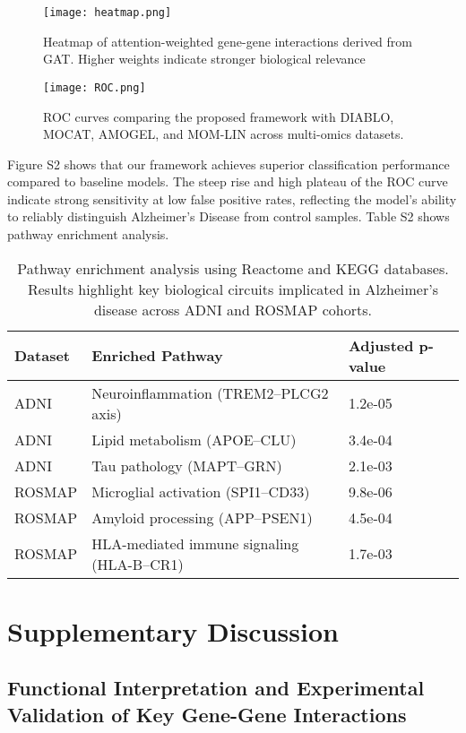 \documentclass[12pt]{article}
\begin{document}
\begin{figure}[H]
\centering
\texttt{[image: heatmap.png]}
\caption{Heatmap of attention-weighted gene-gene interactions derived from GAT. Higher weights indicate stronger biological relevance}
\end{figure}

\begin{figure}[H]
\centering
\texttt{[image: ROC.png]}
\caption{ROC curves comparing the proposed framework with DIABLO, MOCAT, AMOGEL, and MOM-LIN across multi-omics datasets.}
\end{figure}
Figure S2 shows that our framework achieves superior classification performance compared to baseline models. The steep rise and high plateau of the ROC curve indicate strong sensitivity at low false positive rates, reflecting the model’s ability to reliably distinguish Alzheimer’s Disease from control samples.
Table S2 shows pathway enrichment analysis.
\begin{table}[H]
\centering
\scriptsize
\begin{tabular}{lll}
\toprule
\textbf{Dataset} & \textbf{Enriched Pathway} & \textbf{Adjusted p-value} \\
\midrule
ADNI & Neuroinflammation (TREM2–PLCG2 axis) & 1.2e-05 \\
ADNI & Lipid metabolism (APOE–CLU) & 3.4e-04 \\
ADNI & Tau pathology (MAPT–GRN) & 2.1e-03 \\
ROSMAP & Microglial activation (SPI1–CD33) & 9.8e-06 \\
ROSMAP & Amyloid processing (APP–PSEN1) & 4.5e-04 \\
ROSMAP & HLA-mediated immune signaling (HLA-B–CR1) & 1.7e-03 \\
\bottomrule
\end{tabular}
\caption{Pathway enrichment analysis using Reactome and KEGG databases. Results highlight key biological circuits implicated in Alzheimer's disease across ADNI and ROSMAP cohorts.}
\end{table}
\section*{Supplementary Discussion}

\subsection*{Functional Interpretation and Experimental Validation of Key Gene-Gene Interactions}
\end{document}
